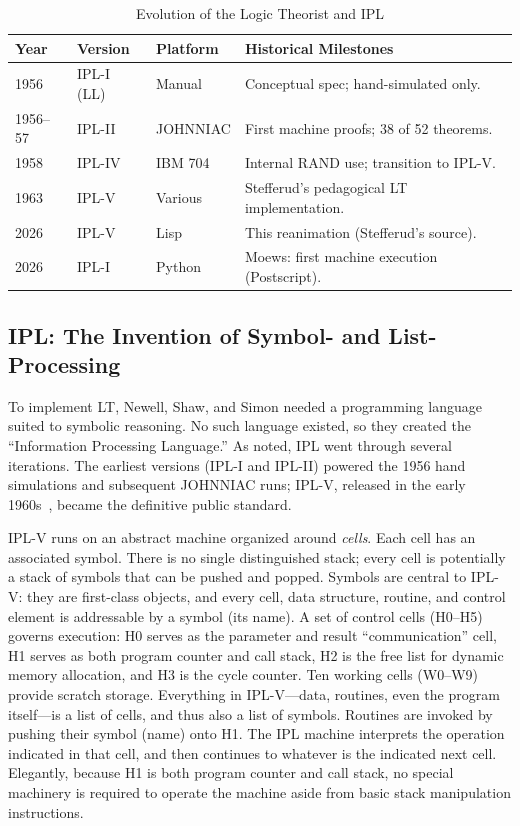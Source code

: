 \documentclass[journal]{IEEEtran}
\begin{document}
\begin{table}[h]
\centering
\caption{Evolution of the Logic Theorist and IPL}
\label{tab:lt_versions}
\begin{tabular}{@{}llll@{}}
\toprule
\textbf{Year} & \textbf{Version} & \textbf{Platform} & \textbf{Historical Milestones} \\ \midrule
1956 & IPL-I (LL) & Manual & Conceptual spec; hand-simulated only. \\
1956--57 & IPL-II & JOHNNIAC & First machine proofs; 38 of 52 theorems. \\
1958 & IPL-IV & IBM 704 & Internal RAND use; transition to IPL-V. \\
1963 & IPL-V & Various & Stefferud's pedagogical LT implementation. \\
2026 & IPL-V & Lisp & This reanimation (Stefferud's source). \\
2026 & IPL-I & Python & Moews: first machine execution (Postscript). \\ \bottomrule
\end{tabular}
\end{table}

\subsection{IPL: The Invention of Symbol- and List-Processing}

To implement LT, Newell, Shaw, and Simon needed a programming language
suited to symbolic reasoning. No such language existed, so they
created the ``Information Processing Language.'' As noted, IPL went
through several iterations. The earliest versions (IPL-I and IPL-II)
powered the 1956 hand simulations and subsequent JOHNNIAC runs;
IPL-V, released in the early 1960s~\cite{newell1964ipl}, became the
definitive public standard.

IPL-V runs on an abstract machine organized around \textit{cells}.
Each cell has an associated symbol. There is no single distinguished
stack; every cell is potentially a stack of symbols that can be pushed
and popped. Symbols are central to IPL-V: they are first-class
objects, and every cell, data structure, routine, and control element
is addressable by a symbol (its name). A set of control cells
(H0--H5) governs execution: H0 serves as the parameter and result
``communication'' cell, H1 serves as both program counter and call
stack, H2 is the free list for dynamic memory allocation, and H3 is
the cycle counter. Ten working cells (W0--W9) provide scratch
storage. Everything in IPL-V---data, routines, even the program
itself---is a list of cells, and thus also a list of symbols. Routines
are invoked by pushing their symbol (name) onto H1. The IPL machine
interprets the operation indicated in that cell, and then continues to
whatever is the indicated next cell. Elegantly, because H1 is both
program counter and call stack, no special machinery is required to
operate the machine aside from basic stack manipulation instructions.
\end{document}
